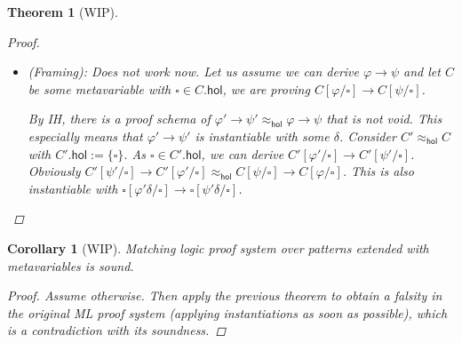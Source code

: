 \documentclass{article}
\numberwithin{deff}{section}
\numberwithin{lemma*}{section}
\newtheorem{corollary*}{Corollary}
\newtheorem{theorem*}{Theorem}
\newcommand{\Pat}{\textsc{Pattern}}
\newcommand{\s}[1]{\{ #1 \}}
\newcommand{\Metavar}{\textsc{Metavar}}
\newcommand{\Hol}{\mathsf{hol}}
\begin{document}
\begin{theorem*}[WIP]
\begin{proof}
\begin{itemize}
      Let us define $s' : \Metavar \to \Pat$ such that $\psi' s' \approx_\Hol \psi' s$ has all hole constraints removed, then $s'$ must satisfy $R'$ and so $\psi' s' \approx_\Hol \psi s$ is derivable from $\psi'$.

      This new schema is not void, as $\psi' s'$ is instantiable by .

      \item (Framing): Does not work now. Let us assume we can derive $\varphi \to \psi$ and let $C$ be some metavariable with $\square \in C.\Hol$, we are proving $C[\varphi/\square] \to C[\psi/\square]$.

      By IH, there is a proof schema of $\varphi' \to \psi' \approx_\Hol \varphi \to \psi$ that is not void.
      This especially means that $\varphi' \to \psi'$ is instantiable with some $\delta$.
      Consider $C' \approx_\Hol C$ with $C'.\Hol := \s{\square}$.
      As $\square \in C'.\Hol$, we can derive $C'[\varphi'/\square] \to C'[\psi'/\square]$.
      Obviously $C'[\psi'/\square] \to C'[\varphi'/\square] \approx_\Hol C[\psi/\square] \to C[\varphi/\square]$.
      This is also instantiable with $\square[\varphi'\delta/\square] \to \square[\psi'\delta/\square]$.
    \end{itemize}
  \end{proof}
\end{theorem*}

\begin{corollary*}[WIP]
  Matching logic proof system over patterns extended with metavariables is sound.
  \begin{proof}
    Assume otherwise.
    Then apply the previous theorem to obtain a falsity in the original ML proof system (applying instantiations as soon as possible), which is a contradiction with its soundness.
  \end{proof}
\end{corollary*}
\end{document}
